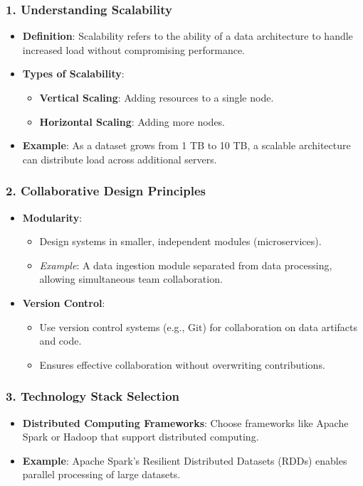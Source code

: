 \documentclass{beamer}
\begin{document}
\begin{frame}[fragile]
    \frametitle{1. Understanding Scalability}
    \begin{itemize}
        \item \textbf{Definition}: Scalability refers to the ability of a data architecture to handle increased load without compromising performance.
        \item \textbf{Types of Scalability}:
            \begin{itemize}
                \item \textbf{Vertical Scaling}: Adding resources to a single node.
                \item \textbf{Horizontal Scaling}: Adding more nodes.
            \end{itemize}
        \item \textbf{Example}: As a dataset grows from 1 TB to 10 TB, a scalable architecture can distribute load across additional servers.
    \end{itemize}
\end{frame}

\begin{frame}[fragile]
    \frametitle{2. Collaborative Design Principles}
    \begin{itemize}
        \item \textbf{Modularity}:
            \begin{itemize}
                \item Design systems in smaller, independent modules (microservices).
                \item \textit{Example}: A data ingestion module separated from data processing, allowing simultaneous team collaboration.
            \end{itemize}
        \item \textbf{Version Control}:
            \begin{itemize}
                \item Use version control systems (e.g., Git) for collaboration on data artifacts and code.
                \item Ensures effective collaboration without overwriting contributions.
            \end{itemize}
    \end{itemize}
\end{frame}

\begin{frame}[fragile]
    \frametitle{3. Technology Stack Selection}
    \begin{itemize}
        \item \textbf{Distributed Computing Frameworks}: Choose frameworks like Apache Spark or Hadoop that support distributed computing.
        \item \textbf{Example}: Apache Spark’s Resilient Distributed Datasets (RDDs) enables parallel processing of large datasets.
    \end{itemize}
\end{frame}
\end{document}
